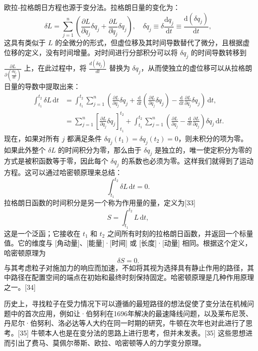 欧拉-拉格朗日方程也源于变分法。拉格朗日量的变化为：
\[
\delta L = \sum_{j=1}^{n} \left( \frac{\partial L}{\partial q_{j}} \delta q_{j} + \frac{\partial L}{\partial \dot{q}_{j}} \delta \dot{q}_{j} \right), \quad \delta \dot{q}_{j} \equiv \delta \frac{\mathrm{d} q_{j}}{\mathrm{d} t} \equiv \frac{\mathrm{d} (\delta q_{j})}{\mathrm{d} t},~
\]
这具有类似于 \( L \) 的全微分的形式，但虚位移及其时间导数替代了微分，且根据虚位移的定义，没有时间增量。对时间进行分部积分可以将 \( \delta q_{j} \) 的时间导数转移到 \( \frac{\partial L}{\partial (\frac{dq_{j}}{dt})} \) 上，在此过程中，将 \( \frac{d(\delta q_{j})}{dt} \) 替换为 \( \delta q_{j} \)，从而使独立的虚位移可以从拉格朗日量的导数中提取出来：
\[
\begin{aligned}
\int_{t_{1}}^{t_{2}} \delta L \, \mathrm{d} t &= \int_{t_{1}}^{t_{2}} \sum_{j=1}^{n} \left( \frac{\partial L}{\partial q_{j}} \delta q_{j} + \frac{\mathrm{d}}{\mathrm{d} t} \left( \frac{\partial L}{\partial \dot{q}_{j}} \delta q_{j} \right) - \frac{\mathrm{d}}{\mathrm{d} t} \frac{\partial L}{\partial \dot{q}_{j}} \delta q_{j} \right) \, \mathrm{d} t,\\
&= \sum_{j=1}^{n} \left[ \frac{\partial L}{\partial \dot{q}_{j}} \delta q_{j} \right]_{t_{1}}^{t_{2}} + \int_{t_{1}}^{t_{2}} \sum_{j=1}^{n} \left( \frac{\partial L}{\partial q_{j}} - \frac{\mathrm{d}}{\mathrm{d} t} \frac{\partial L}{\partial \dot{q}_{j}} \right) \delta q_{j} \, \mathrm{d} t.
\end{aligned}~
\]
现在，如果对所有 \( j \) 都满足条件 \( \delta q_{j}(t_{1}) = \delta q_{j}(t_{2}) = 0 \)，则未积分的项为零。如果此外整个 \( \delta L \) 的时间积分为零，那么由于 \( \delta q_{j} \) 是独立的，唯一使定积分为零的方式是被积函数等于零，因此每个 \( \delta q_{j} \) 的系数也必须为零。这样我们就得到了运动方程。这可以通过哈密顿原理来总结：
\[
\int_{t_{1}}^{t_{2}} \delta L \, \mathrm{d} t = 0.~
\]
拉格朗日函数的时间积分是另一个称为作用量的量，定义为[33]
\[
S = \int_{t_{1}}^{t_{2}} L \, \mathrm{d} t,~
\]
这是一个泛函；它接收在 \( t_{1} \) 和 \( t_{2} \) 之间所有时刻的拉格朗日函数，并返回一个标量值。它的维度与 [角动量]、[能量]·[时间] 或 [长度]·[动量] 相同。根据这个定义，哈密顿原理为
\[
\delta S = 0.~
\]
与其考虑粒子对施加力的响应而加速，不如将其视为选择具有静止作用的路径，其中路径在配置空间的端点在初始和最终时刻保持固定。哈密顿原理是几种作用原理之一。[34]

历史上，寻找粒子在受力情况下可以遵循的最短路径的想法促使了变分法在机械问题中的首次应用，例如让·伯努利在1696年解决的最速降线问题，以及莱布尼茨、丹尼尔·伯努利、洛必达等人大约在同一时期的研究，牛顿在次年也对此进行了思考。[35] 牛顿本人也是在变分法的思路上进行思考，但并未发表。[35] 这些思想进而引出了费马、莫佩尔蒂斯、欧拉、哈密顿等人的力学变分原理。


